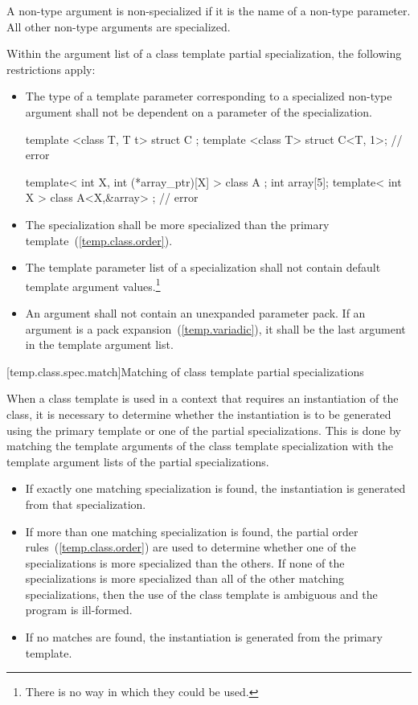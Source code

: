 \pnum
A non-type argument is non-specialized if it is the name of a non-type
parameter.
All other non-type arguments are specialized.

\pnum
Within the argument list of a class template partial specialization,
the following restrictions apply:

\begin{itemize}
\item
The type of a template parameter corresponding to a specialized non-type argument
shall not be dependent on a parameter of the specialization.
\begin{example}

\begin{codeblock}
template <class T, T t> struct C {};
template <class T> struct C<T, 1>;                  // error

template< int X, int (*array_ptr)[X] > class A {};
int array[5];
template< int X > class A<X,&array> { };            // error
\end{codeblock}

\end{example}
\item
The specialization shall be more specialized than the primary
template~(\ref{temp.class.order}).

\item
The template parameter list of a specialization shall not contain default
template argument values.\footnote{There is no way in which they could be used.}
\item
An argument shall not contain an unexpanded parameter pack. If
an argument is a pack expansion~(\ref{temp.variadic}), it shall be
the last argument in the template argument list.
\end{itemize}

[temp.class.spec.match]{Matching of class template partial specializations}

\pnum
When a class template is used in a context that requires an instantiation of
the class,
it is necessary to determine whether the instantiation is to be generated
using the primary template or one of the partial specializations.
This is done by matching the template arguments of the class template
specialization with the template argument lists of the partial
specializations.

\begin{itemize}
\item
If exactly one matching specialization is found, the instantiation is
generated from that specialization.
\item
If more than one matching specialization is found,
the partial order rules~(\ref{temp.class.order}) are used to determine
whether one of the specializations is more specialized than the
others.
If none of the specializations is more specialized than all of the
other matching specializations, then the use of the class template
is ambiguous and the program is ill-formed.
\item
If no matches are found, the instantiation is generated from the
primary template.
\end{itemize}

